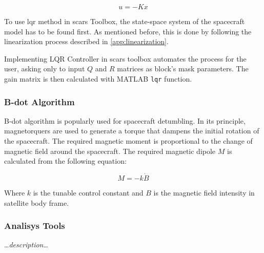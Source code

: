         \begin{equation}
            u = -Kx
        \end{equation}

        To use \ac{lqr} method in \ac{scars} Toolbox, the state-space system of the spacecraft model has to be found first. As mentioned before, this is done by following the linearization process described in \autoref{app:linearization}.

        Implementing LQR Controller in \ac{scars} toolbox automates the process for the user, asking only to input $Q$ and $R$ matrices as block's mask parameters. The gain matrix is then calculated with MATLAB \verb|lqr| function.


    \subsubsection{B-dot Algorithm}
        B-dot algorithm is popularly used for spacecraft detumbling. In its principle, magnetorquers are used to generate a torque that dampens the initial rotation of the spacecraft. The required magnetic moment is proportional to the change of magnetic field around the spacecraft. The required magnetic dipole $M$ is calculated from the following equation:

        \begin{equation}
            M = -k\dot{B}
        \end{equation} 

        Where $k$ is the tunable control constant and $B$ is the magnetic field intensity in satellite body frame\cite{capo2014b}.

    
    \subsubsection{Analisys Tools}
        \dots\textit{description}\dots